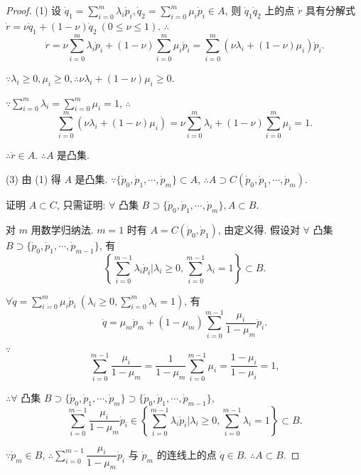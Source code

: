 \documentclass{ctexart}
\begin{document}
\begin{proof}
    (1) 设 $\dot{q}_1=\sum\limits_{i=0}^m\lambda_i\dot{p}_i,\dot{q}_2=\sum\limits_{i=0}^m\mu_i\dot{p}_i\in A$, 则 $\dot{q}_1\dot{q}_2$ 上的点 $\dot{r}$ 具有分解式 $\dot{r}=\nu\dot{q}_1+(1-\nu)\dot{q}_2\ (0\leq\nu\leq1)$. $\therefore$
    \[\dot{r}=\nu\sum\limits_{i=0}^m\lambda_i\dot{p}_i+(1-\nu)\sum\limits_{i=0}^m\mu_i\dot{p}_i=\sum\limits_{i=0}^m(\nu\lambda_i+(1-\nu)\mu_i)\dot{p}_i.\]

    $\because\lambda_i\geq0,\mu_i\geq0,\therefore\nu\lambda_i+(1-\nu)\mu_i\geq0$.

    $\because\sum\limits_{i=0}^m\lambda_i=\sum\limits_{i=0}^m\mu_i=1$, $\therefore$
    \[\sum\limits_{i=0}^m(\nu\lambda_i+(1-\nu)\mu_i)=\nu\sum\limits_{i=0}^m\lambda_i+(1-\nu)\sum\limits_{i=0}^m\mu_i=1.\]

    $\therefore\dot{r}\in A$. $\therefore A$ 是凸集.

    (3) 由 (1) 得 $A$ 是凸集. $\because\{\dot{p}_0,\dot{p}_1,\cdots,\dot{p}_m\}\subset A$, $\therefore A\supset C(\dot{p}_0,\dot{p}_1,\cdots,\dot{p}_m)$.

    证明 $A\subset C$, 只需证明: $\forall$ 凸集 $B\supset\{\dot{p}_0,\dot{p}_1,\cdots,\dot{p}_m\},A\subset B$.

    对 $m$ 用数学归纳法. $m=1$ 时有 $A=C(\dot{p}_0,\dot{p}_1)$, 由定义得. 假设对 $\forall$ 凸集 $B\supset\{\dot{p}_0,\dot{p}_1,\cdots,\dot{p}_{m-1}\}$, 有
    \[\left\{\sum\limits_{i=0}^{m-1}\lambda_i\dot{p}_i\Bigg|\lambda_i\geq0,\sum\limits_{i=0}^{m-1}\lambda_i=1\right\}\subset B.\]

    $\forall\dot{q}=\sum\limits_{i=0}^m\mu_i\dot{p}_i\ \left(\lambda_i\geq0,\sum\limits_{i=0}^m\lambda_i=1\right)$, 有
    \[\dot{q}=\mu_m\dot{p}_m+(1-\mu_m)\sum\limits_{i=0}^{m-1}\dfrac{\mu_i}{1-\mu_m}\dot{p}_i.\]

    $\because$
    \[\sum\limits_{i=0}^{m-1}\dfrac{\mu_i}{1-\mu_m}=\dfrac{1}{1-\mu_m}\sum\limits_{i=0}^{m-1}\mu_i=\dfrac{1-\mu_i}{1-\mu_i}=1,\]

    $\therefore\forall$ 凸集 $B\supset\{\dot{p}_0,\dot{p}_1,\cdots,\dot{p}_m\}\supset\{\dot{p}_0,\dot{p}_1,\cdots,\dot{p}_{m-1}\}$,
    \[\sum\limits_{i=0}^{m-1}\dfrac{\mu_i}{1-\mu_m}\dot{p}_i\in\left\{\sum\limits_{i=0}^{m-1}\lambda_i\dot{p}_i\Bigg|\lambda_i\geq0,\sum\limits_{i=0}^{m-1}\lambda_i=1\right\}\subset B.\]

    $\because\dot{p}_m\in B$, $\therefore\sum\limits_{i=0}^{m-1}\dfrac{\mu_i}{1-\mu_m}\dot{p}_i$ 与 $\dot{p}_m$ 的连线上的点 $\dot{q}\in B$. $\therefore A\subset B$.
\end{proof}
\end{document}
